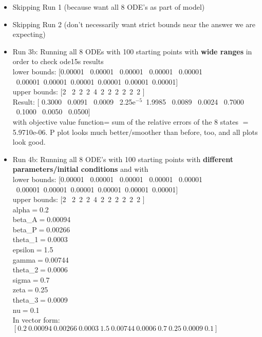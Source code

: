 \documentclass[12pt]{article}
\begin{document}
\begin{itemize} 
\item Skipping Run 1 (because want all 8 ODE's as part of model) 
 \item Skipping Run 2 (don't necessarily want strict bounds near the answer we are expecting)
\item Run 3b: Running all 8 ODEs with 100 starting points with \textbf{wide ranges} in order to check ode15s results\\
lower bounds: [0.00001 \ 0.00001 \ 0.00001 \ 0.00001 \ 0.00001 \ 0.00001\ 0.00001\ 0.00001\ 0.00001\ 0.00001\ 0.00001] \\
upper bounds: [2 \ 2\  2\  2\  4\  2\  2\  2\  2\  2\  2 ] \\

Result: [ 0.3000 \   0.0091 \   0.0009 \  2.25e$^{-5}$\   1.9985 \  0.0089 \ 0.0024 \   0.7000 \   0.1000 \    0.0050 \   0.0500] \\
with objective value function= sum of the relative errors of the 8 states $=$    5.9710e-06. P plot looks much better/smoother than before, too, and all plots look good. 



\item Run 4b: Running all 8 ODE's with 100 starting points with \textbf{different parameters/initial conditions} and with \\
lower bounds: [0.00001 \ 0.00001 \ 0.00001 \ 0.00001 \ 0.00001 \ 0.00001\ 0.00001\ 0.00001\ 0.00001\ 0.00001\ 0.00001] \\
upper bounds: [2 \ 2\  2\  2\  4\  2\  2\  2\  2\  2\  2 ] \\


alpha$=$0.2 \\
beta\_{A}$=$0.00094 \\
beta\_{P}$=$0.00266 \\
theta\_{1}$=$0.0003 \\
epsilon$=$1.5 \\
gamma$=$0.00744 \\
theta\_{2}$=$0.0006 \\
sigma$=$0.7 \\
zeta$=$0.25 \\
theta\_{3}$=$0.0009 \\
nu$=$0.1 \\

In vector form: $[0.2 \ 0.00094 \ 0.00266 \ 0.0003 \ 1.5 \ 0.00744 \ 0.0006 \ 0.7 \ 0.25 \ 0.0009 \ 0.1]$ \\


\end{itemize}
\end{document}
